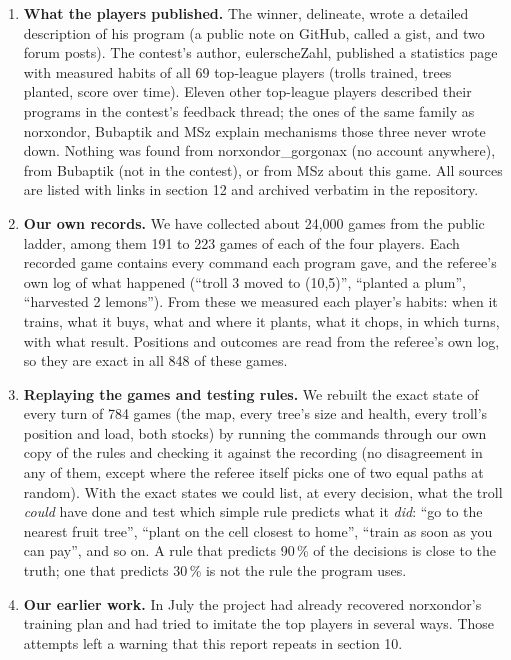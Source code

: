 \documentclass[10pt,a4paper]{article}
\begin{document}
\begin{enumerate}
\item \textbf{What the players published.} The winner, delineate, wrote a detailed description of his program (a public note on GitHub, called a gist, and two forum posts). The contest's author, eulerscheZahl, published a statistics page with measured habits of all 69 top-league players (trolls trained, trees planted, score over time). Eleven other top-league players described their programs in the contest's feedback thread; the ones of the same family as norxondor, Bubaptik and MSz explain mechanisms those three never wrote down. Nothing was found from norxondor\_gorgonax (no account anywhere), from Bubaptik (not in the contest), or from MSz about this game. All sources are listed with links in section 12 and archived verbatim in the repository.
\item \textbf{Our own records.} We have collected about 24,000 games from the public ladder, among them 191 to 223 games of each of the four players. Each recorded game contains every command each program gave, and the referee's own log of what happened (``troll 3 moved to (10,5)'', ``planted a plum'', ``harvested 2 lemons''). From these we measured each player's habits: when it trains, what it buys, what and where it plants, what it chops, in which turns, with what result. Positions and outcomes are read from the referee's own log, so they are exact in all 848 of these games.
\item \textbf{Replaying the games and testing rules.} We rebuilt the exact state of every turn of 784 games (the map, every tree's size and health, every troll's position and load, both stocks) by running the commands through our own copy of the rules and checking it against the recording (no disagreement in any of them, except where the referee itself picks one of two equal paths at random). With the exact states we could list, at every decision, what the troll \emph{could} have done and test which simple rule predicts what it \emph{did}: ``go to the nearest fruit tree'', ``plant on the cell closest to home'', ``train as soon as you can pay'', and so on. A rule that predicts 90\,\% of the decisions is close to the truth; one that predicts 30\,\% is not the rule the program uses.
\item \textbf{Our earlier work.} In July the project had already recovered norxondor's training plan and had tried to imitate the top players in several ways. Those attempts left a warning that this report repeats in section 10.
\end{enumerate}
\end{document}
